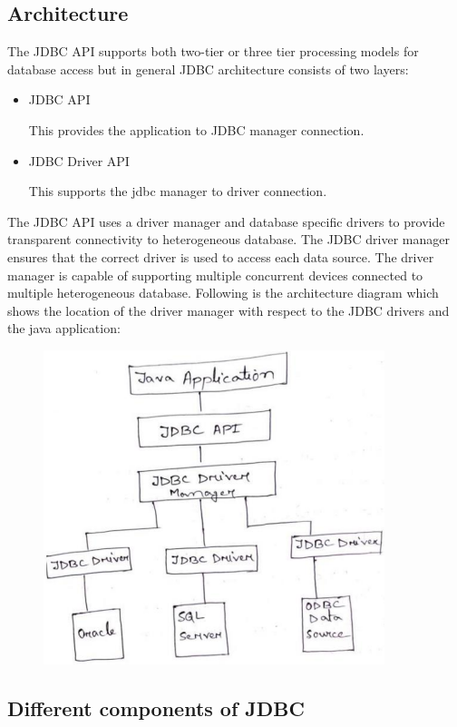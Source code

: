 \documentclass[twocolumn, a4paper]{article}
\begin{document}
\subsection{Architecture}
The JDBC API supports both two-tier or three tier processing models for
database access but in general JDBC architecture consists of two layers:
\begin{itemize}
  \item JDBC API

    This provides the application to JDBC manager connection.
  \item JDBC Driver API

    This supports the jdbc manager to driver connection.
\end{itemize}
The JDBC API uses a driver manager and database specific drivers to provide
transparent connectivity to heterogeneous database. The JDBC driver manager
ensures that the correct driver is used to access each data source. The driver
manager is capable of supporting multiple concurrent devices connected to
multiple heterogeneous database. Following is the architecture diagram which
shows the location of the driver manager with respect to the JDBC drivers and
the java application:
\begin{figure}[ht]
  \centering
  \includegraphics[width=\columnwidth]{jdbcarc}
\end{figure}

\subsection{Different components of JDBC}
\end{document}
